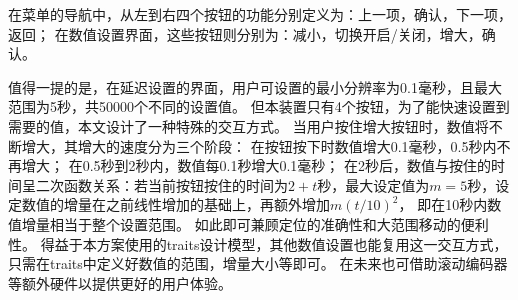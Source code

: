 在菜单的导航中，从左到右四个按钮的功能分别定义为：上一项，确认，下一项，返回；
在数值设置界面，这些按钮则分别为：减小，切换开启/关闭，增大，确认。

值得一提的是，在延迟设置的界面，用户可设置的最小分辨率为0.1毫秒，且最大范围为5秒，共50000个不同的设置值。
但本装置只有4个按钮，为了能快速设置到需要的值，本文设计了一种特殊的交互方式。
当用户按住增大按钮时，数值将不断增大，其增大的速度分为三个阶段：
在按钮按下时数值增大0.1毫秒，0.5秒内不再增大；
在0.5秒到2秒内，数值每0.1秒增大0.1毫秒；
在2秒后，数值与按住的时间呈二次函数关系：若当前按钮按住的时间为$2+t$秒，最大设定值为$m=5$秒，设定数值的增量在之前线性增加的基础上，再额外增加$m(t/10)^2$，
即在10秒内数值增量相当于整个设置范围。
如此即可兼顾定位的准确性和大范围移动的便利性。
得益于本方案使用的traits设计模型，其他数值设置也能复用这一交互方式，只需在traits中定义好数值的范围，增量大小等即可。
在未来也可借助滚动编码器等额外硬件以提供更好的用户体验。
